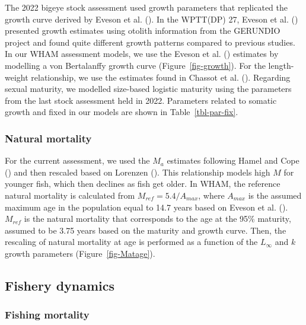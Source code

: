 \documentclass[
]{scrartcl}
\begin{document}
The 2022 bigeye stock assessment used growth parameters that replicated
the growth curve derived by Eveson et al.
(). In the WPTT(DP)
27, Eveson et al. ()
presented growth estimates using otolith information from the GERUNDIO
project and found quite different growth patterns compared to previous
studies. In our WHAM assessment models, we use the Eveson et al.
() estimates by
modelling a von Bertalanffy growth curve (Figure~\ref{fig-growth}). For
the length-weight relationship, we use the estimates found in Chassot et
al. ().
Regarding sexual maturity, we modelled size-based logistic maturity
using the parameters from the last stock assessment held in 2022.
Parameters related to somatic growth and fixed in our models are shown
in Table~\ref{tbl-par-fix}.

\subsubsection{Natural mortality}\label{natural-mortality}

For the current assessment, we used the \(M_a\) estimates following
Hamel and Cope
() and
then rescaled based on Lorenzen
(). This
relationship models high \(M\) for younger fish, which then declines as
fish get older. In WHAM, the reference natural mortality is calculated
from \(M_{ref} = 5.4/A_{max}\), where \(A_{max}\) is the assumed maximum
age in the population equal to 14.7 years based on Eveson et al.
(). \(M_{ref}\) is
the natural mortality that corresponds to the age at the 95\% maturity,
assumed to be 3.75 years based on the maturity and growth curve. Then,
the rescaling of natural mortality at age is performed as a function of
the \(L_\infty\) and \(k\) growth parameters (Figure~\ref{fig-Matage}).

\subsection{Fishery dynamics}\label{fishery-dynamics}

\subsubsection{Fishing mortality}\label{fishing-mortality}
\end{document}
